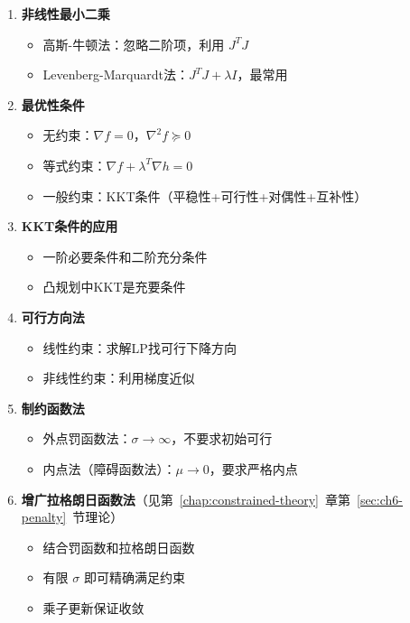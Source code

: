 \begin{conceptbox}
\begin{enumerate}[label=\arabic*., leftmargin=2em]
    \item \textbf{非线性最小二乘}
    \begin{itemize}
        \item 高斯-牛顿法：忽略二阶项，利用 $J^T J$
        \item Levenberg-Marquardt法：$J^T J + \lambda I$，最常用
    \end{itemize}
    \item \textbf{最优性条件}
    \begin{itemize}
        \item 无约束：$\nabla f = 0$，$\nabla^2 f \succeq 0$
        \item 等式约束：$\nabla f + \lambda^T \nabla h = 0$
        \item 一般约束：KKT条件（平稳性+可行性+对偶性+互补性）
    \end{itemize}
    \item \textbf{KKT条件的应用}
    \begin{itemize}
        \item 一阶必要条件和二阶充分条件
        \item 凸规划中KKT是充要条件
    \end{itemize}
    \item \textbf{可行方向法}
    \begin{itemize}
        \item 线性约束：求解LP找可行下降方向
        \item 非线性约束：利用梯度近似
    \end{itemize}
    \item \textbf{制约函数法}
    \begin{itemize}
        \item 外点罚函数法：$\sigma \to \infty$，不要求初始可行
        \item 内点法（障碍函数法）：$\mu \to 0$，要求严格内点
    \end{itemize}
    \item \textbf{增广拉格朗日函数法}（见第~\ref{chap:constrained-theory}~章第~\ref{sec:ch6-penalty}~节理论）
    \begin{itemize}
        \item 结合罚函数和拉格朗日函数
        \item 有限 $\sigma$ 即可精确满足约束
        \item 乘子更新保证收敛

\end{itemize}
\end{enumerate}
\end{conceptbox}
